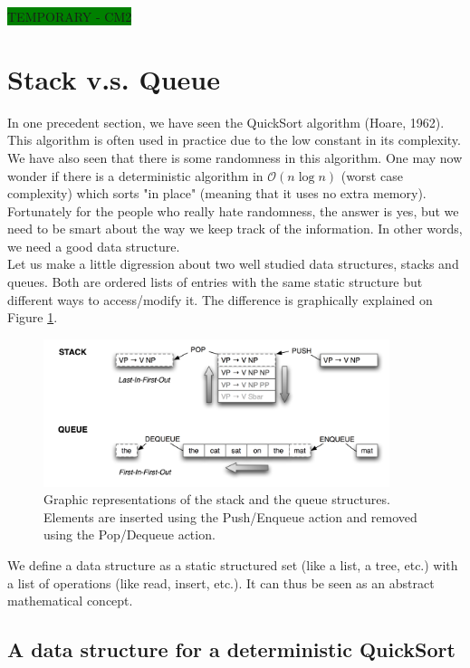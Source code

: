 \colorbox{green}{TEMPORARY - CM2}

\section{Stack v.s. Queue}

In one precedent section, we have seen the QuickSort algorithm (Hoare, 1962). This algorithm is often used in practice due to the low constant in its complexity. We have also seen that there is some randomness in this algorithm. One may now wonder if there is a deterministic algorithm in $\mathcal{O}(n\log n)$ (worst case complexity) which sorts "in place" (meaning that it uses no extra memory).\\ 

Fortunately for the people who really hate randomness, the answer is yes, but we need to be smart about the way we keep track of the information. In other words, we need a good data structure.\\

Let us make a little digression about two well studied data structures, stacks and queues. Both are ordered lists of entries with the same static structure but different ways to access/modify it. The difference is graphically explained on Figure \ref{stackandqueue}.

\begin{figure}[!h]
	\centering
 	\includegraphics[width=0.9\textwidth]{images/CM2/stack-queue.png}
  	\caption{Graphic representations of the stack and the queue structures. Elements are inserted using the Push/Enqueue action and removed using the Pop/Dequeue action.}
   	\label{stackandqueue}
\end{figure}

We define a data structure as a static structured set (like a list, a tree, etc.) with a list of operations (like read, insert, etc.). It can thus be seen as an abstract mathematical concept. 

\subsection{A data structure for a deterministic QuickSort}

